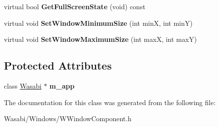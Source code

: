 \begin{DoxyCompactItemize}
\item 
virtual bool {\bfseries Get\+Full\+Screen\+State} (void) const \hypertarget{class_w_window_component_a757ee7bf98df6a2058e0861d5b4b05e2}{}\label{class_w_window_component_a757ee7bf98df6a2058e0861d5b4b05e2}

\item 
virtual void {\bfseries Set\+Window\+Minimum\+Size} (int minX, int minY)\hypertarget{class_w_window_component_a1aeaac2a0b2beb3d2bbb014d175cb8ee}{}\label{class_w_window_component_a1aeaac2a0b2beb3d2bbb014d175cb8ee}

\item 
virtual void {\bfseries Set\+Window\+Maximum\+Size} (int maxX, int maxY)\hypertarget{class_w_window_component_ae90070207224fc1ab3745b01db19cd73}{}\label{class_w_window_component_ae90070207224fc1ab3745b01db19cd73}

\end{DoxyCompactItemize}
\subsection*{Protected Attributes}
\begin{DoxyCompactItemize}
\item 
class \hyperlink{class_wasabi}{Wasabi} $\ast$ {\bfseries m\+\_\+app}\hypertarget{class_w_window_component_af440d5a531da52189eda4f3de4b6abc4}{}\label{class_w_window_component_af440d5a531da52189eda4f3de4b6abc4}

\end{DoxyCompactItemize}


The documentation for this class was generated from the following file\+:\begin{DoxyCompactItemize}
\item 
Wasabi/\+Windows/W\+Window\+Component.\+h\end{DoxyCompactItemize}
